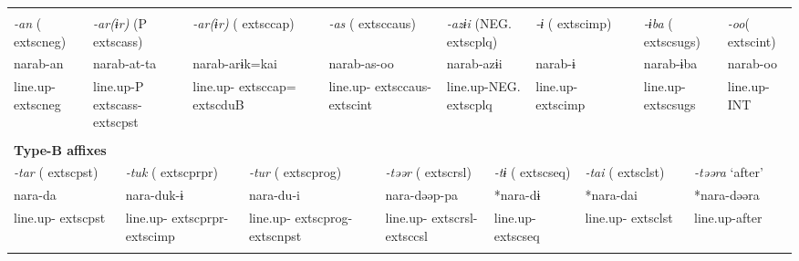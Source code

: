 \tabletail{}
\tablelasttail{}
\begin{tabularx}{\textwidth}{XXXXXXXXXm{}XXXXXXXXXXXX}
\lsptoprule
\multicolumn{22}{X}{{\bfseries Type-A affixes}}\\
{ \textit{{}-an} (	extsc{neg})} & \multicolumn{5}{X}{{ \textit{{}-ar(ɨr)} (P	extsc{ass})}} & \multicolumn{3}{X}{{ \textit{{}-ar(ɨr)} (	extsc{cap})}} & \multicolumn{4}{X}{{ \textit{{}-as} (	extsc{caus})}} & \multicolumn{4}{X}{{ \textit{{}-azɨi} (NEG.	extsc{plq})}} & \multicolumn{2}{X}{{ \textit{{}-ɨ} (	extsc{imp})}} & \multicolumn{2}{X}{{ \textit{{}-ɨba} (	extsc{sugs})}} & { \textit{{}-oo}(	extsc{int})}\\
{ narab-an} & \multicolumn{5}{X}{{ narab-at-ta}} & \multicolumn{3}{X}{{ narab-arɨk=kai}} & \multicolumn{4}{X}{{ narab-as-oo}} & \multicolumn{4}{X}{{ narab-azɨi}} & \multicolumn{2}{X}{{ narab-ɨ}} & \multicolumn{2}{X}{{ narab-ɨba}} & { narab-oo}\\
line.up-	extsc{neg} & \multicolumn{5}{X}{line.up-P	extsc{ass}-	extsc{pst}} & \multicolumn{3}{X}{line.up-	extsc{cap}=	extsc{du}B} & \multicolumn{4}{X}{line.up-	extsc{caus}-	extsc{int}} & \multicolumn{4}{X}{line.up-NEG.	extsc{plq}} & \multicolumn{2}{X}{line.up-	extsc{imp}} & \multicolumn{2}{X}{line.up-	extsc{sugs}} & line.up-INT\\
\multicolumn{22}{X}{}\\
\multicolumn{22}{X}{{\bfseries Type-B affixes}}\\
\multicolumn{3}{X}{{ \textit{{}-tar} (	extsc{pst})}} & \multicolumn{4}{X}{{ \textit{{}-tuk} (	extsc{prpr})}} & \multicolumn{4}{X}{{ \textit{{}-tur} (	extsc{prog})}} & \multicolumn{4}{X}{{ \textit{{}-təər} (	extsc{rsl})}} & \multicolumn{3}{X}{{ \textit{{}-tɨ} (	extsc{seq})}} & \multicolumn{2}{X}{{ \textit{{}-tai} (	extsc{lst})}} & \multicolumn{2}{X}{{ \textit{{}-təəra} ‘after’}}\\
\multicolumn{3}{X}{{ nara-da}} & \multicolumn{4}{X}{{ nara-duk-ɨ}} & \multicolumn{4}{X}{{ nara-du-i}} & \multicolumn{4}{X}{{ nara-dəəp-pa}} & \multicolumn{3}{X}{{ *nara-dɨ}} & \multicolumn{2}{X}{{ *nara-dai}} & \multicolumn{2}{X}{{ *nara-dəəra}}\\
\multicolumn{3}{X}{line.up-	extsc{pst}} & \multicolumn{4}{X}{line.up-	extsc{prpr}-	extsc{imp}} & \multicolumn{4}{X}{line.up-	extsc{prog}-	extsc{npst}} & \multicolumn{4}{X}{line.up-	extsc{rsl}-	extsc{csl}} & \multicolumn{3}{X}{line.up-	extsc{seq}} & \multicolumn{2}{X}{line.up-	extsc{lst}} & \multicolumn{2}{X}{{ line.up-after}}\\
\multicolumn{3}{X}{} & \multicolumn{4}{X}{} & \multicolumn{4}{X}{} & \multicolumn{4}{X}{} & \multicolumn{3}{X}{} & \multicolumn{2}{X}{} & \multicolumn{2}{X}{}\\

\end{tabularx}
